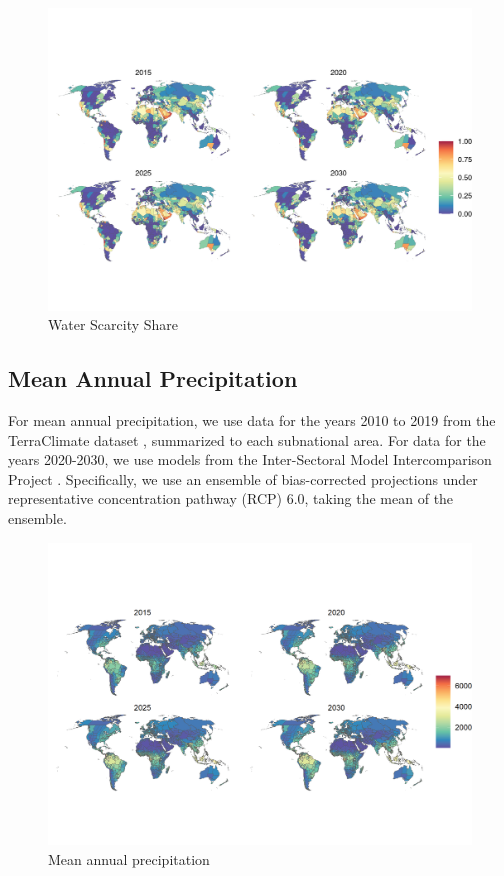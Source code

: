\documentclass{article}
\begin{document}
\begin{figure}[H]
  \centering
  \includegraphics[width=\linewidth]{img/covars/ws_share.png}
  \caption{Water Scarcity Share}
\end{figure}


\subsection{Mean Annual Precipitation}
For mean annual precipitation, we use data for the years 2010 to 2019 from the TerraClimate dataset \citep{abatzoglou2018terraclimate}, summarized to each subnational area.  For data for the years 2020-2030, we use models from the Inter-Sectoral Model Intercomparison Project \citep{warszawski2014inter}.  Specifically, we use an ensemble of bias-corrected projections under representative concentration pathway (RCP) 6.0, taking the mean of the ensemble.

\begin{figure}[H]
  \centering
  \includegraphics[width=\linewidth]{img/covars/precip.png}
  \caption{Mean annual precipitation}
\end{figure}
\end{document}
